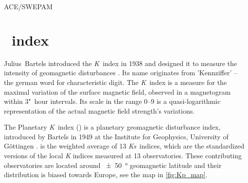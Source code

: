 ACE/SWEPAM\\	%


\section{\Kp{}~index}
\label{sec:kp_index}
Julius~Bartels introduced the \textit{K}~index in 1938 and designed it to measure the intensity of geomagnetic disturbances \citep{Bartels1939}. Its name originates from 'Kennziffer' -- the german word for characteristic digit. The \textit{K}~index is a measure for the maximal variation of the surface magnetic field, observed in a magnetogram within 3"~hour intervals. Its scale in the range 0--9 is a quasi-logarithmic representation of the actual magnetic field strength's variations.

The Planetary \textit{K}~index (\Kp{}) is a planetary geomagnetic disturbance index, introduced by Bartels in 1949 at the Institute for Geophysics, University of Göttingen \citep{Bartels1949}. \Kp{} is the weighted average of 13 \textit{Ks}~indices, which are the standardized versions of the local \textit{K} indices measured at 13 observatories. These contributing observatories are located around \SI{+-50}{\degree} geomagnetic latitude and their distribution is biased towards Europe, see the map in \autoref{fig:Kp_map}.
\begin{figure}[htb]
\end{figure}

